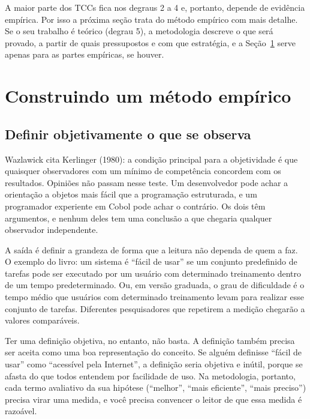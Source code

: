 \documentclass[10pt,a4paper]{extarticle}
\theoremstyle{definition}
\begin{document}
A maior parte dos TCCs fica nos degraus 2 a 4 e, portanto, depende de evidência empírica. Por isso a próxima seção trata do método empírico com mais detalhe. Se o seu trabalho é teórico (degrau 5), a metodologia descreve o que será provado, a partir de quais pressupostos e com que estratégia, e a Seção~\ref{sec:construcao} serve apenas para as partes empíricas, se houver.

\section{Construindo um método empírico}\label{sec:construcao}

\subsection{Definir objetivamente o que se observa}

Wazlawick cita Kerlinger (1980): a condição principal para a objetividade é que quaisquer observadores com um mínimo de competência concordem com os resultados. Opiniões não passam nesse teste. Um desenvolvedor pode achar a orientação a objetos mais fácil que a programação estruturada, e um programador experiente em Cobol pode achar o contrário. Os dois têm argumentos, e nenhum deles tem uma conclusão a que chegaria qualquer observador independente.

A saída é definir a grandeza de forma que a leitura não dependa de quem a faz. O exemplo do livro: um sistema é \enquote{fácil de usar} se um conjunto predefinido de tarefas pode ser executado por um usuário com determinado treinamento dentro de um tempo predeterminado. Ou, em versão graduada, o grau de dificuldade é o tempo médio que usuários com determinado treinamento levam para realizar esse conjunto de tarefas. Diferentes pesquisadores que repetirem a medição chegarão a valores comparáveis.

Ter uma definição objetiva, no entanto, não basta. A definição também precisa ser aceita como uma boa representação do conceito. Se alguém definisse \enquote{fácil de usar} como \enquote{acessível pela Internet}, a definição seria objetiva e inútil, porque se afasta do que todos entendem por facilidade de uso. Na metodologia, portanto, cada termo avaliativo da sua hipótese (\enquote{melhor}, \enquote{mais eficiente}, \enquote{mais preciso}) precisa virar uma medida, e você precisa convencer o leitor de que essa medida é razoável.
\end{document}

